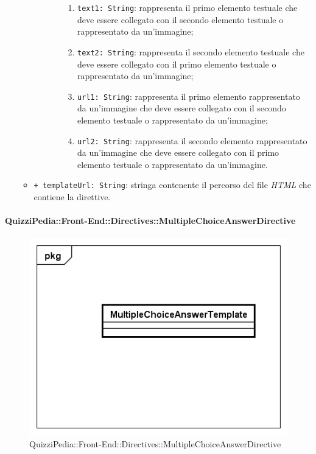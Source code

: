 \begin{itemize}
\begin{itemize}
\begin{itemize}
\begin{itemize}
						\begin{enumerate}
							\item \texttt{text1: String}: rappresenta il primo elemento testuale che deve essere collegato con il secondo elemento testuale o rappresentato da un’immagine;
							\item \texttt{text2: String}: rappresenta il secondo elemento testuale che deve essere collegato con il primo elemento testuale o rappresentato da un’immagine;
							\item \texttt{url1: String}: rappresenta il primo elemento rappresentato da un'immagine che deve essere collegato con il secondo elemento testuale o rappresentato da un’immagine;
							\item \texttt{url2: String}: rappresenta il secondo elemento rappresentato da un'immagine che deve essere collegato con il primo elemento testuale o rappresentato da un’immagine.
						\end{enumerate}
					\end{itemize}
				\end{itemize}
				\item \texttt{+ templateUrl: String}: stringa contenente il percorso del file \textit{HTML} che contiene la direttive.
					
			\end{itemize}
		\end{itemize}
		
		\paragraph{QuizziPedia::Front-End::Directives::MultipleChoiceAnswerDirective}
		
		\label{QuizziPedia::Front-End::Directives::MultipleChoiceAnswerDirective}
		
		\begin{figure}[ht]
			\centering
			\includegraphics[scale=0.5,keepaspectratio]{UML/Classi/Front-End/QuizziPedia_Front-end_Templates_MultipleChoiceAnswerTemplate.png}
			\caption{QuizziPedia::Front-End::Directives::MultipleChoiceAnswerDirective}
		\end{figure} \FloatBarrier
		
